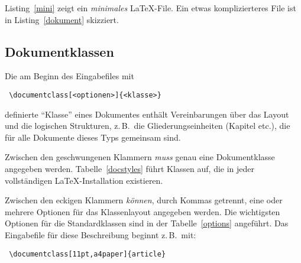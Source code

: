 Listing~\ref{mini} zeigt ein \emph{minimales} \LaTeX-File. Ein etwas 
komplizierteres File ist in Listing~\ref{dokument} skizziert.
 



\subsection{Dokumentklassen}\label{docsty}
 
Die am Beginn des Eingabefiles  mit
\begin{lstlisting}
 \documentclass[<optionen>]{<klasse>}
\end{lstlisting}
definierte "`Klasse"' eines Dokumentes enthält Vereinbarungen über das Layout 
und die logischen Strukturen, z.\,B.\ die Gliederungseinheiten (Kapitel etc.\@), 
die für alle Dokumente dieses Typs gemeinsam sind.

Zwischen den geschwungenen Klammern \emph{muss} genau eine Dokumentklasse
angegeben werden.  Tabelle~\vref{docstyles} führt 
Klassen auf, die in jeder vollständigen \LaTeX-Installation existieren. 

Zwischen den eckigen Klammern \emph{können}, durch Kommas getrennt, eine oder 
mehrere Optionen für das Klassenlayout angegeben werden. Die wichtigsten 
Optionen für die Standardklassen sind in der Tabelle~\vref{options} angeführt.
Das Eingabefile für diese Beschreibung beginnt z.\,B.\ mit:
\begin{lstlisting}
 \documentclass[11pt,a4paper]{article}
\end{lstlisting}


